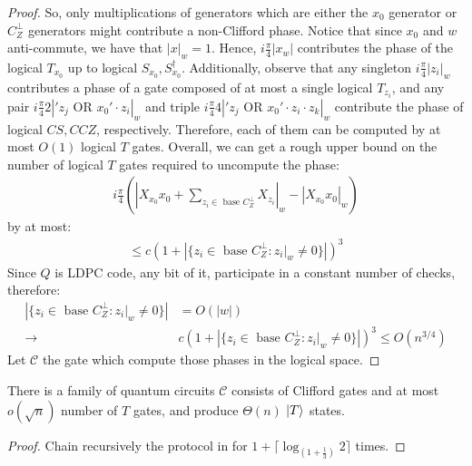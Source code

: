 \documentclass[manuscript,screen,review]{acmart}
\begin{document}
\begin{proof}
  So, only multiplications of generators which are either the $x_{0}$ generator or $C_{Z}^{\perp}$ generators might contribute a non-Clifford phase. Notice that since $x_{0}$ and $w$ anti-commute, we have that $|x|_{w}=1$. Hence, $i\frac{\pi}{4}|x_{w}|$ contributes the phase of the logical $T_{x_{0}}$ up to logical $S_{x_{0}},S^{\dagger}_{x_{0}}$. Additionally, observe that any singleton $i\frac{\pi}{4}|z_{i}|_{w}$ contributes a phase of a gate composed of at most a single logical $T_{z_{i}}$, and any pair $i\frac{\pi}{4}2|' z_{j} \text{ OR } x_{0}'\cdot z_{i}|_{w}$ and triple $i\frac{\pi}{4}4|' z_{j} \text{ OR } x_{0}'\cdot z_{i} \cdot z_{k}|_{w}$ contribute the phase of logical $CS, CCZ$, respectively. Therefore, each of them can be computed by at most $O(1)$ logical $T$ gates. Overall, we can get a rough upper bound on the number of logical $T$ gates required to uncompute the phase:
\begin{equation*}
  \begin{split}
i\frac{\pi}{4} \left(|X_{x_{0}}x_{0} + \sum_{z_i \in \text{ base } C_{Z}^{\perp}}{X_{z_{i}}}|_{w} - |X_{x_{0}}x_{0}|_{w} \right)
  \end{split}
\end{equation*}
by at most: 
\begin{equation*}
  \begin{split}
    \le c \left( 1 + \left| \{z_{i} \in \text{ base } C_{Z}^{\perp}  : z_{i}|_{w} \neq 0 \} \right| \right)^{3}
  \end{split}
\end{equation*}
Since $Q$ is LDPC code, any bit of it, participate in a constant number of checks, therefore:
\begin{equation*}
  \begin{split}
    \left| \{z_{i} \in \text{ base } C_{Z}^{\perp}  : z_{i}|_{w} \neq 0 \} \right| & = O(|w|)\\
    \rightarrow & c \left( 1 + \left| \{z_{i} \in \text{ base } C_{Z}^{\perp}  : z_{i}|_{w} \neq 0 \} \right| \right)^{3} \le O(n^{3/4} )
  \end{split}
\end{equation*}
Let $\mathcal{C}$ the gate which compute those phases in the logical space. 
\end{proof}

\begin{claim}
  There is a family of quantum circuits $\mathcal{C}$ consists of Clifford gates and at most $o(\sqrt{n})$ number of $T$ gates, and produce $\Theta(n)$ $\ket{T}$ states. 
\end{claim}
\begin{proof}
  Chain recursively the protocol in  for $ 1 + \lceil \log_{(1 + \frac{1}{3})}{2} \rceil  $ times.
\end{proof}
\end{document}
